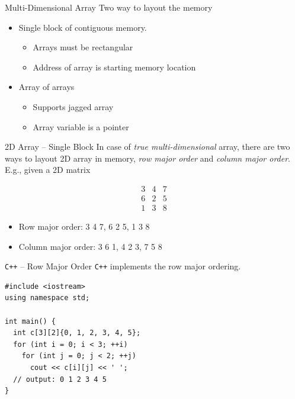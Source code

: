 \documentclass[presentation]{beamer}
\begin{document}
\begin{frame}[label={sec:orgheadline31}]{Multi-Dimensional Array}
Two way to layout the memory
\begin{itemize}
\item Single block of contiguous memory.
\begin{itemize}
\item Arrays must be rectangular
\item Address of array is starting memory location
\end{itemize}
\item Array of arrays
\begin{itemize}
\item Supports jagged array
\item Array variable is a pointer
\end{itemize}
\end{itemize}
\end{frame}

\begin{frame}[label={sec:orgheadline32}]{2D Array -- Single Block}
In case of \emph{true multi-dimensional} array, there are two ways to
layout 2D array in memory, \emph{row major order} and \emph{column major
order}.  E.g., given a 2D matrix

\[\begin{array}{ccc}
   3 & 4 & 7\\
   6 & 2 & 5\\
   1 & 3 & 8
   \end{array}
   \]

\begin{itemize}
\item Row major order: 3 4 7, 6 2 5, 1 3 8
\item Column major order: 3 6 1, 4 2 3, 7 5 8
\end{itemize}
\end{frame}

\begin{frame}[fragile,label={sec:orgheadline33}]{\texttt{C++} -- Row Major Order}
 \texttt{C++} implements the row major ordering.

\begin{verbatim}
#include <iostream>
using namespace std;

int main() {
  int c[3][2]{0, 1, 2, 3, 4, 5};
  for (int i = 0; i < 3; ++i)
    for (int j = 0; j < 2; ++j)
      cout << c[i][j] << ' ';
  // output: 0 1 2 3 4 5
}
\end{verbatim}
\end{frame}
\end{document}
